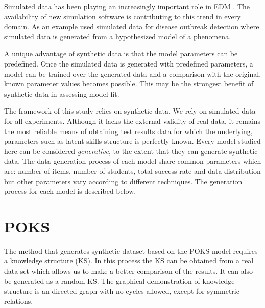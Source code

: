 \label{sec:Syn}


Simulated data has been playing an increasingly important role in EDM \citep{JEDM:baker2009}. The availability of new simulation software is contributing to this trend in every domain. As an example \citet{jafarpour2015quantifying} used simulated data for disease outbreak detection where simulated data is generated from a hypothesized model of a phenomena.

A unique advantage of synthetic data is that the model parameters can be predefined. Once the simulated data is generated with predefined parameters, a model can be trained over the generated data and a comparison with the original, known parameter values becomes possible. This may be the strongest benefit of synthetic data in assessing model fit. 

The framework of this study relies on synthetic data. We rely on simulated data for all experiments. Although it lacks the external validity of real data, it remains the most reliable means of obtaining test results data for which the underlying, parameters such as latent skills structure is perfectly known. Every model studied here can be considered \textit{generative}, to the extent that they can generate synthetic data.  The data generation process of each model share common parameters which are: number of items, number of students, total success rate and data distribution but other parameters vary according to different techniques.  The generation process for each model is described below.


\section{POKS}
The method that generates synthetic dataset based on the POKS model requires a knowledge structure (KS). In this process the KS can be obtained from a real data set which allows us to make a better comparison of the results. It can also be generated as a random KS. The graphical demonstration of knowledge structure is an directed graph with no cycles allowed, except for symmetric relations.  

